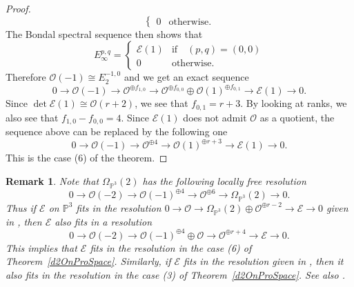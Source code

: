 \documentclass[a4paper,12pt]{amsart}
\newtheorem{rmk}[thm]{Remark}%
\begin{document}
\begin{proof}
\[\begin{cases}
0&\textrm{otherwise}.
\end{cases}
\]
The Bondal spectral sequence then shows that
\[E_{\infty}^{p,q}=
\begin{cases}
\mathcal{E}(1)& \textrm{if}\quad  (p,q)= (0,0)\\
0&\textrm{otherwise}.
\end{cases}
\]
Therefore $\mathcal{O}(-1)\cong E_2^{-1,0}$ and we get an exact sequence
\[
0\to \mathcal{O}(-1)\to \mathcal{O}^{\oplus f_{1,0}}\to \mathcal{O}^{\oplus f_{0,0}}\oplus \mathcal{O}(1)^{\oplus f_{0,1}}
\to \mathcal{E}(1)\to 0.\]
Since $\det\mathcal{E}(1)\cong \mathcal{O}(r+2)$, we see that $f_{0,1}=r+3$.
By looking at ranks, we also see that $f_{1,0}-f_{0,0}=4$.
Since $\mathcal{E}(1)$ does not admit $\mathcal{O}$ as a quotient, the sequence above can be replaced by the following one
\[
0\to \mathcal{O}(-1)\to \mathcal{O}^{\oplus 4}\to \mathcal{O}(1)^{\oplus r+3}
\to \mathcal{E}(1)\to 0.\]
This is the case (6) of the theorem.
\end{proof}
\begin{rmk}\label{avoidmisunderstanding1}
Note that $\Omega_{\mathbb{P}^3}(2)$ has the following locally free resolution 
\[0\to \mathcal{O}(-2)\to \mathcal{O}(-1)^{\oplus 4}\to \mathcal{O}^{\oplus 6}\to \Omega_{\mathbb{P}^3}(2)\to 0.\]
Thus if $\mathcal{E}$ on $\mathbb{P}^3$ fits in  the resolution 
$0\to \mathcal{O}\to \Omega_{\mathbb{P}^3}(2)\oplus \mathcal{O}^{\oplus r-2}\to \mathcal{E}\to 0$
given in \cite[Theorem 1 (2)]{pswnef}, then 
$\mathcal{E}$ also fits in  a resolution
\[0\to \mathcal{O}(-2)
\to \mathcal{O}(-1)^{\oplus 4}\oplus \mathcal{O}\to \mathcal{O}^{\oplus r+4}\to \mathcal{E}\to 0.\]
This implies that $\mathcal{E}$ fits in the resolution in the case (6) of Theorem~\ref{d2OnProSpace}.
Similarly, if $\mathcal{E}$ fits in the resolution given in \cite[Theorem 1 (3)]{pswnef}, then
it also fits in the resolution in the case (3) of Theorem~\ref{d2OnProSpace}.
See also \cite[\S 4, Proposition 1 and Remark 2]{MR3275418}.
\end{rmk}
\end{document}
